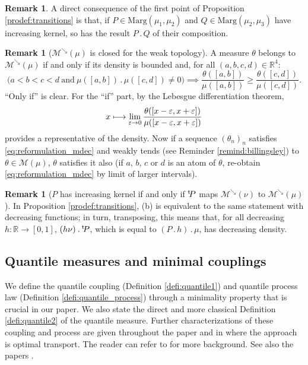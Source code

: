 \documentclass[11pt]{article}
\newcommand{\ldot}{\mathbin{.}}
\newcommand\mto{\mathchoice{\longmapsto}{\mapsto}{\mapsto}{\mapsto}}
\theoremstyle{plain}
\theoremstyle{definition}
\newtheorem{rem}[them]{Remark}
\newcommand{\trans}{{}^{\mathrm{t}}\mkern-1mu}
\let\eps\varepsilon
\newcommand{\m}{\mathcal{M}}
\newcommand{\ma}{\mathrm{Marg}}
\newcommand{\R}{\mathbb{R}}
\newcommand{\mdec}{\mathcal{M}^{\scriptscriptstyle\searrow}}
\begin{document}
\begin{rem}\label{rem:transitions_croissantes_composee} A direct consequence of the first point of Proposition \ref{prodef:transitions} is that, if $P\in\ma(\mu_1,\mu_2)$ and $Q\in\ma(\mu_2,\mu_3)$ have increasing kernel, so has the result $P\ldot Q$ of their composition.
\end{rem}

\begin{rem}[$\mdec(\mu)$ is closed for the weak topology]\label{rem:mdec} A measure $\theta$ belongs to $\mdec(\mu)$ if and only if its density is bounded and, for all $(a,b,c,d)\in\R^4$:
\begin{equation}\label{eq:reformulation_mdec}
\bigl(a<b<c<d\ \text{and}\ \mu([a,b])\ldot\mu([c,d])\neq0\bigr)\implies \frac{\theta([a,b])}{\mu([a,b])}\geqslant \frac{\theta([c,d])}{\mu([c,d])}.
\end{equation}
``Only if'' is clear. For the ``if'' part, by the Lebesgue differentiation theorem,
\[
x\mto\lim_{\eps\to0}\frac{\theta([x-\varepsilon,x+\varepsilon])}{\mu([x-\varepsilon,x+\varepsilon])}
\]
provides a representative of the density. Now if a sequence $(\theta_n)_n$ satisfies \eqref{eq:reformulation_mdec} and weakly tends (see Reminder \ref{remind:billingsley}) to $\theta\in\m(\mu)$, $\theta$ satisfies it also (if $a$, $b$, $c$ or $d$ is an atom of $\theta$, re-obtain \eqref{eq:reformulation_mdec} by limit of larger intervals).
\end{rem}

\begin{rem}[$P$ has increasing kernel if and only if $\trans\!P$ maps $\mdec(\nu)$ to $\mdec(\mu)$]\label{rem:stable}
In Proposition \ref{prodef:transitions}, (b) is equivalent to the same statement with decreasing functions; in turn, transposing, this means that, for all decreasing $h:\R\to[0,1]$, $(h\nu)\ldot\trans\!P$, which is equal to $(P\ldot h)\ldot\mu$, has decreasing density.
\end{rem}

\subsection{Quantile measures and minimal couplings}\label{ss:minimality}
We define the quantile coupling (Definition \ref{defi:quantile1}) and quantile process law (Definition \ref{defi:quantile_process}) through a minimality property that is crucial in our paper. We also state the direct and more classical Definition \ref{defi:quantile2} of the quantile measure. Further characterizations of these coupling and process are given throughout the paper and in \cite{BouJui2} where the approach is optimal transport. The reader can refer to \cite{RR, Vi1} for more background. See also the papers \cite{Ju_seminaire, Pass}.
\end{document}
